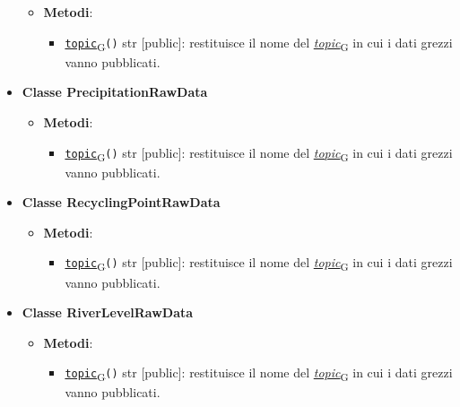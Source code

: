 \begin{itemize}
\begin{itemize}
		      \item \textbf{Metodi}:
		            \begin{itemize}
			            \item \href{https://7last.github.io/docs/pb/documentazione-interna/glossario\#topic}{\texttt{topic}\textsubscript{G}}\texttt{()} str [public]: restituisce il nome del \href{https://7last.github.io/docs/pb/documentazione-interna/glossario\#topic}{\textit{topic}\textsubscript{G}} in cui i dati grezzi vanno pubblicati.
		            \end{itemize}
	      \end{itemize}
	\item \textbf{Classe PrecipitationRawData}
	      \begin{itemize}
		      \item \textbf{Metodi}:
		            \begin{itemize}
			            \item \href{https://7last.github.io/docs/pb/documentazione-interna/glossario\#topic}{\texttt{topic}\textsubscript{G}}\texttt{()} str [public]: restituisce il nome del \href{https://7last.github.io/docs/pb/documentazione-interna/glossario\#topic}{\textit{topic}\textsubscript{G}} in cui i dati grezzi vanno pubblicati.
		            \end{itemize}
	      \end{itemize}
	\item \textbf{Classe RecyclingPointRawData}
	      \begin{itemize}
		      \item \textbf{Metodi}:
		            \begin{itemize}
			            \item \href{https://7last.github.io/docs/pb/documentazione-interna/glossario\#topic}{\texttt{topic}\textsubscript{G}}\texttt{()} str [public]: restituisce il nome del \href{https://7last.github.io/docs/pb/documentazione-interna/glossario\#topic}{\textit{topic}\textsubscript{G}} in cui i dati grezzi vanno pubblicati.
		            \end{itemize}
	      \end{itemize}
	\item \textbf{Classe RiverLevelRawData}
	      \begin{itemize}
		      \item \textbf{Metodi}:
		            \begin{itemize}
			            \item \href{https://7last.github.io/docs/pb/documentazione-interna/glossario\#topic}{\texttt{topic}\textsubscript{G}}\texttt{()} str [public]: restituisce il nome del \href{https://7last.github.io/docs/pb/documentazione-interna/glossario\#topic}{\textit{topic}\textsubscript{G}} in cui i dati grezzi vanno pubblicati.

\end{itemize}
\end{itemize}
\end{itemize}
